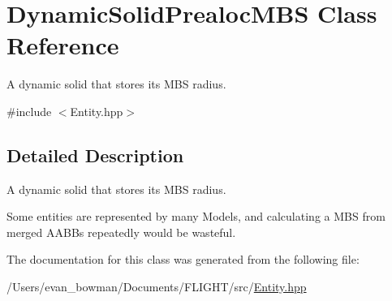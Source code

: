 \hypertarget{class_dynamic_solid_prealoc_m_b_s}{}\section{Dynamic\+Solid\+Prealoc\+M\+BS Class Reference}
\label{class_dynamic_solid_prealoc_m_b_s}


A dynamic solid that stores it\textquotesingle{}s M\+BS radius.  




{\ttfamily \#include $<$Entity.\+hpp$>$}



\subsection{Detailed Description}
A dynamic solid that stores it\textquotesingle{}s M\+BS radius. 

Some entities are represented by many Models, and calculating a M\+BS from merged A\+A\+B\+Bs repeatedly would be wasteful. 

The documentation for this class was generated from the following file\+:\begin{DoxyCompactItemize}
\item 
/\+Users/evan\+\_\+bowman/\+Documents/\+F\+L\+I\+G\+H\+T/src/\hyperlink{_entity_8hpp}{Entity.\+hpp}\end{DoxyCompactItemize}
